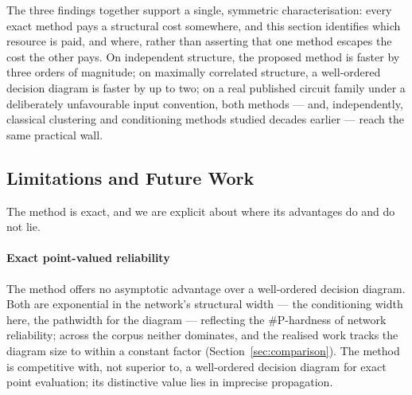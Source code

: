 \documentclass[preprint,12pt]{elsarticle}
\theoremstyle{definition}
\begin{document}
The three findings together support a single, symmetric characterisation: every exact method pays a
structural cost somewhere, and this section identifies which resource is paid, and where, rather than
asserting that one method escapes the cost the other pays. On independent structure, the proposed method
is faster by three orders of magnitude; on maximally correlated structure, a well-ordered decision diagram
is faster by up to two; on a real published circuit family under a deliberately unfavourable input
convention, both methods --- and, independently, classical clustering and conditioning methods studied
decades earlier --- reach the same practical wall.

\subsection{Limitations and Future Work}\label{sec:limitations}

The method is exact, and we are explicit about where its advantages do and do not lie.

\paragraph{Exact point-valued reliability} The method offers no asymptotic advantage over a well-ordered
decision diagram. Both are exponential in the network's structural width --- the conditioning width
here, the pathwidth for the diagram --- reflecting the \#P-hardness of network reliability; across the
corpus neither dominates, and the realised work tracks the diagram size to within a constant factor
(Section~\ref{sec:comparison}). The method is competitive with, not superior to, a well-ordered decision
diagram for exact point evaluation; its distinctive value lies in imprecise propagation.
\end{document}

